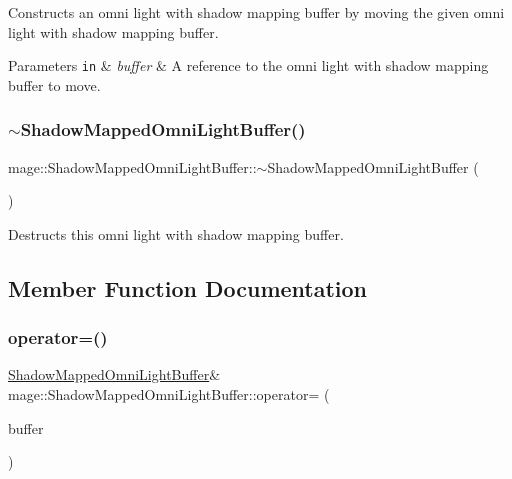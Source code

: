 Constructs an omni light with shadow mapping buffer by moving the given omni light with shadow mapping buffer.


\begin{DoxyParams}[1]{Parameters}
\mbox{\tt in}  & {\em buffer} & A reference to the omni light with shadow mapping buffer to move. \\
\hline
\end{DoxyParams}
\hypertarget{structmage_1_1_shadow_mapped_omni_light_buffer_a1a56dcb8621d38894f939b704e0bdd1a}{}\label{structmage_1_1_shadow_mapped_omni_light_buffer_a1a56dcb8621d38894f939b704e0bdd1a} 
\subsubsection{\texorpdfstring{$\sim$\+Shadow\+Mapped\+Omni\+Light\+Buffer()}{~ShadowMappedOmniLightBuffer()}}
{\footnotesize\ttfamily mage\+::\+Shadow\+Mapped\+Omni\+Light\+Buffer\+::$\sim$\+Shadow\+Mapped\+Omni\+Light\+Buffer (\begin{DoxyParamCaption}{ }\end{DoxyParamCaption})\hspace{0.3cm}{\ttfamily [default]}}

Destructs this omni light with shadow mapping buffer. 

\subsection{Member Function Documentation}
\hypertarget{structmage_1_1_shadow_mapped_omni_light_buffer_a575b96d6ebeee24e639048b0d257a462}{}\label{structmage_1_1_shadow_mapped_omni_light_buffer_a575b96d6ebeee24e639048b0d257a462} 
\subsubsection{\texorpdfstring{operator=()}{operator=()}\hspace{0.1cm}{\footnotesize\ttfamily [1/2]}}
{\footnotesize\ttfamily \hyperlink{structmage_1_1_shadow_mapped_omni_light_buffer}{Shadow\+Mapped\+Omni\+Light\+Buffer}\& mage\+::\+Shadow\+Mapped\+Omni\+Light\+Buffer\+::operator= (\begin{DoxyParamCaption}\item[{const \hyperlink{structmage_1_1_shadow_mapped_omni_light_buffer}{Shadow\+Mapped\+Omni\+Light\+Buffer} \&}]{buffer }\end{DoxyParamCaption})\hspace{0.3cm}{\ttfamily [default]}}

